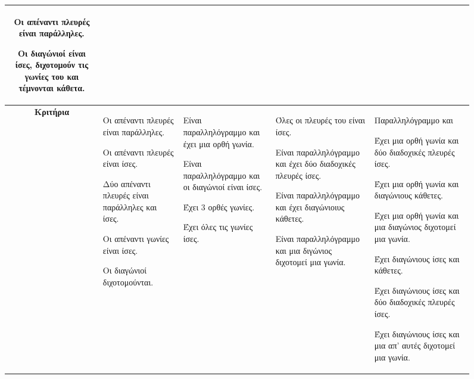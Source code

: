 \documentclass[twoside,nofonts,internet,shmeiwseis]{thewria}
\begin{document}
\begin{sidewaysfigure}
\begin{tabular}{c|>{\centering\arraybackslash}m{5.3cm}|>{\centering\arraybackslash}m{4.5cm}|>{\centering\arraybackslash}m{5.5cm}|>{\centering\arraybackslash}m{6.5cm}}
\begin{rlist}[leftmargin=5mm]
\item Οι απέναντι πλευρές είναι παράλληλες.
\item Οι διαγώνιοί είναι ίσες, διχοτομούν τις γωνίες του και τέμνονται κάθετα.
\end{rlist} \\
\hline\rule[-2ex]{0pt}{5.5ex}\textbf{Κριτήρια}  & \begin{rlist}[leftmargin=5mm]
\item Οι απέναντι πλευρές είναι παράλληλες.
\item Οι απέναντι πλευρές είναι ίσες.
\item Δύο απέναντι πλευρές είναι παράλληλες και ίσες.
\item Οι απέναντι γωνίες είναι ίσες.
\item Οι διαγώνιοί διχοτομούνται.
\end{rlist} & \begin{rlist}[leftmargin=5mm]
\item Είναι παραλληλόγραμμο και έχει μια ορθή γωνία.
\item Είναι παραλληλόγραμμο και οι διαγώνιοί είναι ίσες.
\item Έχει 3 ορθές γωνίες.
\item Έχει όλες τις γωνίες ίσες.
\end{rlist} & \begin{rlist}[leftmargin=5mm]
\item Όλες οι πλευρές του είναι ίσες.
\item Είναι παραλληλόγραμμο και έχει δύο διαδοχικές πλευρές ίσες.
\item Είναι παραλληλόγραμμο και έχει διαγώνιοιυς κάθετες.
\item Είναι παραλληλόγραμμο και μια διγώνιος διχοτομεί μια γωνία.
\end{rlist} & Παραλληλόγραμμο και
\begin{rlist}[leftmargin=5mm]
\item Έχει μια ορθή γωνία και δύο διαδοχικές πλευρές ίσες.
\item Έχει μια ορθή γωνία και διαγώνιους κάθετες.
\item Έχει μια ορθή γωνία και μια διαγώνιος διχοτομεί μια γωνία.
\item Έχει διαγώνιους ίσες και κάθετες.
\item Έχει διαγώνιους ίσες και δύο διαδοχικές πλευρές ίσες.
\item Έχει διαγώνιους ίσες και μια απ' αυτές διχοτομεί μια γωνία.
\end{rlist} \\
\hline
\end{tabular}
\end{sidewaysfigure}
\end{document}
